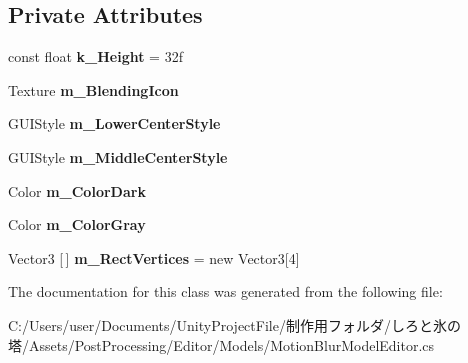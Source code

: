 \subsection*{Private Attributes}
\begin{DoxyCompactItemize}
\item 
\mbox{\label{class_unity_editor_1_1_post_processing_1_1_motion_blur_model_editor_1_1_graph_drawer_ad389031105559fb3ed06f452b487f0ec}} 
const float {\bfseries k\+\_\+\+Height} = 32f
\item 
\mbox{\label{class_unity_editor_1_1_post_processing_1_1_motion_blur_model_editor_1_1_graph_drawer_ad7ef3eab31e49782aad4d80640d8e557}} 
Texture {\bfseries m\+\_\+\+Blending\+Icon}
\item 
\mbox{\label{class_unity_editor_1_1_post_processing_1_1_motion_blur_model_editor_1_1_graph_drawer_a7f527436e1284f21372ca686e5f199cc}} 
G\+U\+I\+Style {\bfseries m\+\_\+\+Lower\+Center\+Style}
\item 
\mbox{\label{class_unity_editor_1_1_post_processing_1_1_motion_blur_model_editor_1_1_graph_drawer_ad6b945547a80f13451cc14d615f8a769}} 
G\+U\+I\+Style {\bfseries m\+\_\+\+Middle\+Center\+Style}
\item 
\mbox{\label{class_unity_editor_1_1_post_processing_1_1_motion_blur_model_editor_1_1_graph_drawer_a287cafbbaee30908fe947023d32b9d4d}} 
Color {\bfseries m\+\_\+\+Color\+Dark}
\item 
\mbox{\label{class_unity_editor_1_1_post_processing_1_1_motion_blur_model_editor_1_1_graph_drawer_aa2e6b9dd7f3199c3e5bf689a2e2ff718}} 
Color {\bfseries m\+\_\+\+Color\+Gray}
\item 
\mbox{\label{class_unity_editor_1_1_post_processing_1_1_motion_blur_model_editor_1_1_graph_drawer_a31eb9e45a17b1e744ee1528bd57cb885}} 
Vector3 \mbox{[}$\,$\mbox{]} {\bfseries m\+\_\+\+Rect\+Vertices} = new Vector3\mbox{[}4\mbox{]}
\end{DoxyCompactItemize}


The documentation for this class was generated from the following file\+:\begin{DoxyCompactItemize}
\item 
C\+:/\+Users/user/\+Documents/\+Unity\+Project\+File/制作用フォルダ/しろと氷の塔/\+Assets/\+Post\+Processing/\+Editor/\+Models/Motion\+Blur\+Model\+Editor.\+cs\end{DoxyCompactItemize}
